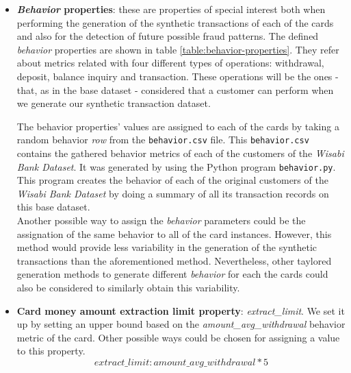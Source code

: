 \begin{itemize}
\item \textbf{\emph{Behavior} properties}: these are properties of special interest both when performing the 
generation of the synthetic transactions of each of the cards and also for the detection of future possible fraud patterns. The defined \emph{behavior} properties are shown in table \ref{table:behavior-properties}. They refer about metrics related with four different types of operations: withdrawal, deposit, balance inquiry and transaction. These operations will be the ones - that, as in the base dataset - considered that a customer can perform when we generate our synthetic transaction dataset.



The behavior properties' values are assigned to each of the cards by taking a random behavior \emph{row} from the \texttt{behavior.csv} file. This \texttt{behavior.csv} contains the gathered behavior metrics of each of the customers of the \emph{Wisabi Bank Dataset}. It was generated by using the Python program \texttt{behavior.py}. This program creates the behavior of each of the original customers of the \emph{Wisabi Bank Dataset} by doing a summary of all its transaction records on this base dataset.\\

Another possible way to assign the \emph{behavior} parameters could be the assignation
of the same behavior to all of the card instances. However, this method would provide less variability in
the generation of the synthetic transactions than the aforementioned method. 
Nevertheless, other taylored generation methods to generate different \emph{behavior} for 
each the cards could also be considered to similarly obtain this
variability.

\item \textbf{Card money amount extraction limit property}: \emph{extract\_limit}. We set it up by setting an upper bound based on the \emph{amount\_avg\_withdrawal} behavior metric of the card. Other possible ways could be chosen for assigning a value to this property.
    $$extract\_limit: amount\_avg\_withdrawal * 5$$
\end{itemize}

